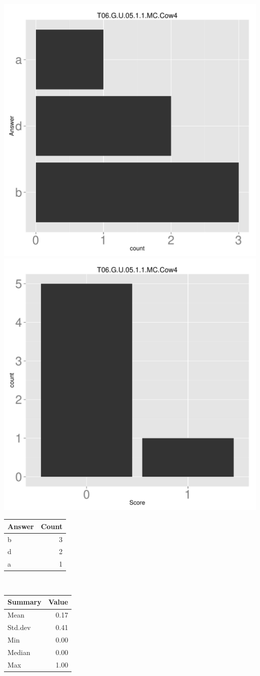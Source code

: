 \documentclass[12pt,english,nohyper]{tufte-handout}\usepackage[]{graphicx}\usepackage[]{color}
\begin{document}
\begin{center} \includegraphics[width=.45\linewidth]{Topic06_AB_89_answer} \includegraphics[width=.45\linewidth]{Topic06_AB_89_score} \end{center} 

\begin{center}%
\begin{tabular}{lr}
  \hline
Answer & Count \\ 
  \hline
b &   3 \\ 
  d &   2 \\ 
  a &   1 \\ 
   \hline
\end{tabular}
~~~~~~~~%
\begin{tabular}{lr}
  \hline
Summary & Value \\ 
  \hline
Mean & 0.17 \\ 
  Std.dev & 0.41 \\ 
  Min & 0.00 \\ 
  Median & 0.00 \\ 
  Max & 1.00 \\ 
   \hline
\end{tabular}
\end{center}\newpage
\end{document}
